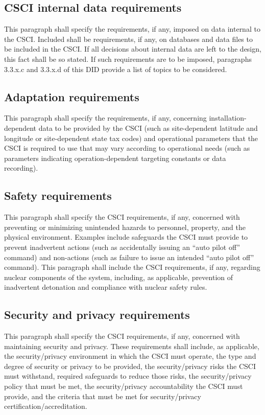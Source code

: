 \documentclass{fidata-report-template}
\begin{document}
\subsection{CSCI internal data requirements}

This paragraph shall specify the requirements, if any, imposed on data
internal to the CSCI. Included shall be requirements, if any, on
databases and data files to be included in the CSCI. If all decisions
about internal data are left to the design, this fact shall be so
stated. If such requirements are to be imposed, paragraphs 3.3.x.c and
3.3.x.d of this DID provide a list of topics to be considered.

\subsection{Adaptation requirements}

This paragraph shall specify the requirements, if any, concerning
installation-dependent data to be provided by the CSCI (such as
site-dependent latitude and longitude or site-dependent state tax codes)
and operational parameters that the CSCI is required to use that may
vary according to operational needs (such as parameters indicating
operation-dependent targeting constants or data recording).

\subsection{Safety requirements}

This paragraph shall specify the CSCI requirements, if any, concerned
with preventing or minimizing unintended hazards to personnel, property,
and the physical environment. Examples include safeguards the CSCI must
provide to prevent inadvertent actions (such as accidentally issuing an
``auto pilot off'' command) and non-actions (such as failure to issue an
intended ``auto pilot off'' command). This paragraph shall include the
CSCI requirements, if any, regarding nuclear components of the system,
including, as applicable, prevention of inadvertent detonation and
compliance with nuclear safety rules.

\subsection{Security and privacy requirements}

This paragraph shall specify the CSCI requirements, if any, concerned
with maintaining security and privacy. These requirements shall include,
as applicable, the security/privacy environment in which the CSCI must
operate, the type and degree of security or privacy to be provided, the
security/privacy risks the CSCI must withstand, required safeguards to
reduce those risks, the security/privacy policy that must be met, the
security/privacy accountability the CSCI must provide, and the criteria
that must be met for security/privacy certification/accreditation.
\end{document}
